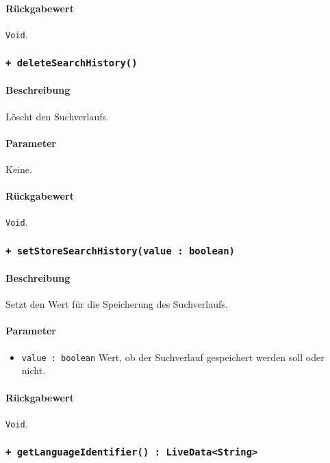 \paragraph*{Rückgabewert}
\texttt{Void}.

\subsubsection*{\texttt{+ deleteSearchHistory()}}\label{App_Settings_ISettingsModel_deleteSearchHistory}%
\paragraph*{Beschreibung}
Löscht den Suchverlaufs.
\paragraph*{Parameter}
Keine.
\paragraph*{Rückgabewert}
\texttt{Void}.

\subsubsection*{\texttt{+ setStoreSearchHistory(value : boolean)}}\label{App_Settings_ISettingsModel_setStoreSearchHistory}%
\paragraph*{Beschreibung}
Setzt den Wert für die Speicherung des Suchverlaufs.
\paragraph*{Parameter}
\begin{itemize}
    \item \texttt{value : boolean} Wert, ob der Suchverlauf gespeichert werden soll oder nicht.
\end{itemize}
\paragraph*{Rückgabewert}
\texttt{Void}.

\subsubsection*{\texttt{+ getLanguageIdentifier() : LiveData<String>}}\label{App_Settings_ISettingsModel_getLanguageIdentifier}%

